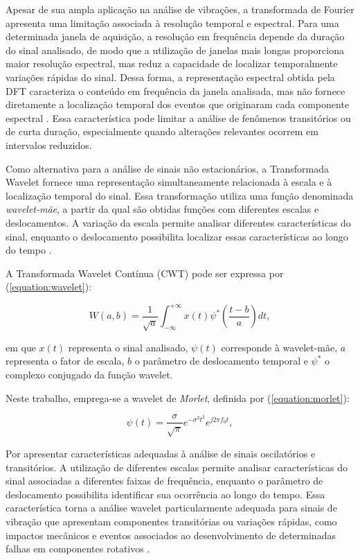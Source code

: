 \documentclass[conference]{IEEEtran}
\begin{document}
Apesar de sua ampla aplicação na análise de vibrações, a transformada de Fourier apresenta uma limitação associada à resolução temporal e espectral. Para uma determinada janela de aquisição, a resolução em frequência depende da duração do sinal analisado, de modo que a utilização de janelas mais longas proporciona maior resolução espectral, mas reduz a capacidade de localizar temporalmente variações rápidas do sinal. Dessa forma, a representação espectral obtida pela DFT caracteriza o conteúdo em frequência da janela analisada, mas não fornece diretamente a localização temporal dos eventos que originaram cada componente espectral \cite{oppenheim2010discrete}. Essa característica pode limitar a análise de fenômenos transitórios ou de curta duração, especialmente quando alterações relevantes ocorrem em intervalos reduzidos.

Como alternativa para a análise de sinais não estacionários, a Transformada Wavelet fornece uma representação simultaneamente relacionada à escala e à localização temporal do sinal. Essa transformação utiliza uma função denominada \textit{wavelet-mãe}, a partir da qual são obtidas funções com diferentes escalas e deslocamentos. A variação da escala permite analisar diferentes características do sinal, enquanto o deslocamento possibilita localizar essas características ao longo do tempo \cite{randall2011vibration}.

A Transformada Wavelet Contínua (CWT) pode ser expressa por (\ref{equation:wavelet}):

\begin{equation}
W(a,b) =
\frac{1}{\sqrt{a}}
\int_{-\infty}^{+\infty}
x(t)\psi^{*}
\left(
\frac{t-b}{a}
\right)dt,
\label{equation:wavelet}
\end{equation}

em que $x(t)$ representa o sinal analisado, $\psi(t)$ corresponde à wavelet-mãe, $a$ representa o fator de escala, $b$ o parâmetro de deslocamento temporal e $\psi^{*}$ o complexo conjugado da função wavelet.

Neste trabalho, emprega-se a wavelet de \textit{Morlet}, definida por (\ref{equation:morlet}):

\begin{equation}
\psi(t) =
\frac{\sigma}{\sqrt{\pi}}
e^{-\sigma^2 t^2}
e^{j2\pi f_0t},
\label{equation:morlet}
\end{equation}

Por apresentar características adequadas à análise de sinais oscilatórios e transitórios. A utilização de diferentes escalas permite analisar características do sinal associadas a diferentes faixas de frequência, enquanto o parâmetro de deslocamento possibilita identificar sua ocorrência ao longo do tempo. Essa característica torna a análise wavelet particularmente adequada para sinais de vibração que apresentam componentes transitórias ou variações rápidas, como impactos mecânicos e eventos associados ao desenvolvimento de determinadas falhas em componentes rotativos \cite{randall2011vibration}.
\end{document}
